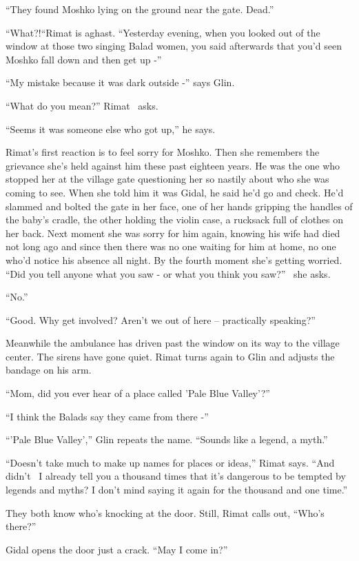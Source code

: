 \documentclass[twoside,11pt]{book}
\begin{document}
``They found Moshko lying on the ground near the gate. Dead.''

``What?!``Rimat is aghast{. }``Yesterday evening, when you looked
out of the window at those two singing Balad women, you said afterwards that you'd seen Moshko fall down and then get
up -''

``My mistake because it was dark outside -'' says Glin.

``What do you mean?'' Rimat \ asks.

``Seems it was someone else who got up,'' he says.

Rimat's first reaction is to feel sorry for Moshko. Then she remembers the grievance she's held against him these
past{ }eighteen years. He was the one who stopped her at the village gate questioning her so nastily
about who she was coming to see. When she told him it was Gidal, he said he'd go and check. He'd slammed and bolted the
gate in her face, one of her hands gripping the handles of the baby's cradle, the other holding the violin case, a
rucksack full of clothes on her back. Next moment she was sorry for him again, knowing his wife had died not long ago
and since then there was no one waiting for him at home, no one who'd notice his absence all night. By the fourth
moment she's getting worried. ``Did you tell anyone what you saw - or what you think you
saw?'' \ she asks.

``No.''

``Good. Why get involved? Aren't we out of here -- practically speaking?''

Meanwhile the ambulance has driven past the window on its way to the village center. The sirens have gone quiet. Rimat
turns again to Glin and adjusts the bandage on his arm.

``Mom, did you ever hear of a place called 'Pale Blue Valley'?''

``I think the Balads say they came from there -''

``'Pale Blue Valley','' Glin repeats the name. ``Sounds like a legend, a
myth.''

``Doesn't take much to make up names for places or ideas,'' Rimat says. ``And
didn't \ I already tell you a thousand times that it's dangerous to be tempted by legends and myths? I don't mind
saying it again for the thousand and one time.''

They both know who's knocking at the door. Still, Rimat calls out, ``Who's there?''

Gidal opens the door just a crack. ``May I come in?''
\end{document}
